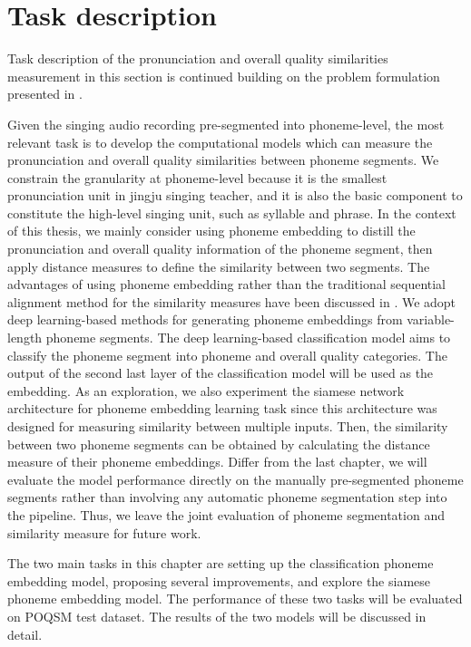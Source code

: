 \section{Task description}

Task description of the pronunciation and overall quality similarities measurement in this section is continued building on the problem formulation presented in .

Given the singing audio recording pre-segmented into phoneme-level, the most relevant task is to develop the computational models which can measure the pronunciation and overall quality similarities between phoneme segments. We constrain the granularity at phoneme-level because it is the smallest pronunciation unit in jingju singing teacher, and it is also the basic component to constitute the high-level singing unit, such as syllable and phrase. In the context of this thesis, we mainly consider using phoneme embedding to distill the pronunciation and overall quality information of the phoneme segment, then apply distance measures to define the similarity between two segments. The advantages of using phoneme embedding rather than the traditional sequential alignment method for the similarity measures have been discussed in . We adopt deep learning-based methods for generating phoneme embeddings from variable-length phoneme segments. The deep learning-based classification model aims to classify the phoneme segment into phoneme and overall quality categories. The output of the second last layer of the classification model will be used as the embedding. As an exploration, we also experiment the siamese network architecture for phoneme embedding learning task since this architecture was designed for measuring similarity between multiple inputs. Then, the similarity between two phoneme segments can be obtained by calculating the distance measure of their phoneme embeddings. Differ from the last chapter, we will evaluate the model performance directly on the manually pre-segmented phoneme segments rather than involving any automatic phoneme segmentation step into the pipeline. Thus, we leave the joint evaluation of phoneme segmentation and similarity measure for future work.

The two main tasks in this chapter are setting up the classification phoneme embedding model, proposing several improvements, and explore the siamese phoneme embedding model. The performance of these two tasks will be evaluated on POQSM test dataset. The results of the two models will be discussed in detail.

